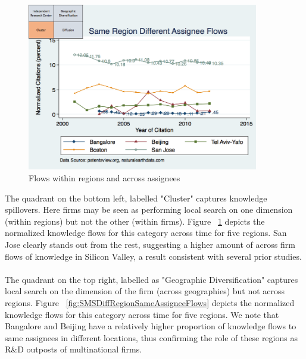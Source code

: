 \documentclass[10pt,letterpaper]{article}
\begin{document}
\begin{figure}[h!]
\begin{centering}
  \includegraphics[width=0.90\textwidth]{SMSSameRegionDiffAssigneeFlows}
  \caption{Flows within regions and across assignees}
  \label{fig:SMSSameRegionDiffAssigneeFlows}
\end{centering}
\end{figure}
The quadrant on the bottom left, labelled "Cluster" captures knowledge spillovers. Here firms may be seen as performing local search on one dimension (within regions) but not the other (within firms). Figure ~\ref{fig:SMSSameRegionDiffAssigneeFlows} depicts the normalized knowledge flows for this category across time for five regions. San Jose clearly stands out from the rest, suggesting a higher amount of across firm flows of knowledge in Silicon Valley, a result consistent with several prior studies.
\\\\
The quadrant on the top right, labelled as "Geographic Diversification" captures local search on the dimension of the firm (across geographies) but not across regions. Figure ~\ref{fig:SMSDiffRegionSameAssigneeFlows} depicts the normalized knowledge flows for this category across time for five regions. We note that Bangalore and Beijing have a relatively higher proportion of knowledge flows to same assignees in different locations, thus confirming the role of these regions as R\&D outposts of multinational firms.
\\\\
\end{document}
